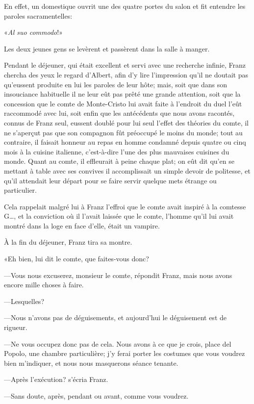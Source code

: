 En effet, un domestique ouvrit une des quatre portes du salon et fit entendre les paroles sacramentelles: 

«\textit{Al suo commodo}!» 

Les deux jeunes gens se levèrent et passèrent dans la salle à manger. 

Pendant le déjeuner, qui était excellent et servi avec une recherche infinie, Franz chercha des yeux le regard d'Albert, afin d'y lire l'impression qu'il ne doutait pas qu'eussent produite en lui les paroles de leur hôte; mais, soit que dans son insouciance habituelle il ne leur eût pas prêté une grande attention, soit que la concession que le comte de Monte-Cristo lui avait faite à l'endroit du duel l'eût raccommodé avec lui, soit enfin que les antécédents que nous avons racontés, connus de Franz seul, eussent doublé pour lui seul l'effet des théories du comte, il ne s'aperçut pas que son compagnon fût préoccupé le moins du monde; tout au contraire, il faisait honneur au repas en homme condamné depuis quatre ou cinq mois à la cuisine italienne, c'est-à-dire l'une des plus mauvaises cuisines du monde. Quant au comte, il effleurait à peine chaque plat; on eût dit qu'en se mettant à table avec ses convives il accomplissait un simple devoir de politesse, et qu'il attendait leur départ pour se faire servir quelque mets étrange ou particulier. 

Cela rappelait malgré lui à Franz l'effroi que le comte avait inspiré à la comtesse G\dots, et la conviction où il l'avait laissée que le comte, l'homme qu'il lui avait montré dans la loge en face d'elle, était un vampire. 

À la fin du déjeuner, Franz tira sa montre. 

«Eh bien, lui dit le comte, que faites-vous donc? 

—Vous nous excuserez, monsieur le comte, répondit Franz, mais nous avons encore mille choses à faire. 

—Lesquelles? 

—Nous n'avons pas de déguisements, et aujourd'hui le déguisement est de rigueur. 

—Ne vous occupez donc pas de cela. Nous avons à ce que je crois, place del Popolo, une chambre particulière; j'y ferai porter les costumes que vous voudrez bien m'indiquer, et nous nous masquerons séance tenante. 

—Après l'exécution? s'écria Franz. 

—Sans doute, après, pendant ou avant, comme vous voudrez. 

